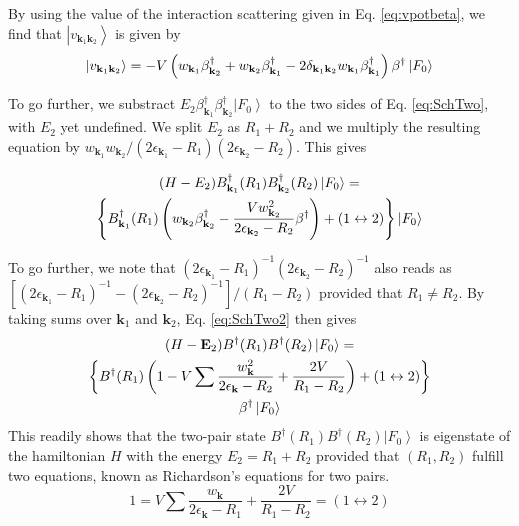 \documentclass[aps,prb,superscriptaddress,twocolumn]{revtex4}
\begin{document}
By using the value of the interaction scattering given in Eq.%
\eqref{eq:vpotbeta}, we find that $\left|v_{\mathbf{k} _1\mathbf{k}
_2}\right> $ is given by 
\begin{equation}
\left|v_{\mathbf{k} _1\mathbf{k} _2}\right> =-V\left(w_{\mathbf{k}
_1}\beta^{\dagger}_{\mathbf{k} _2}+w_{\mathbf{k} _2}\beta^{\dagger}_{\mathbf{%
k} _1}-2\delta_{\mathbf{k} _1\mathbf{k} _2}w_{\mathbf{k} _1}\beta^{\dagger}_{%
\mathbf{k} _1}\right) \beta^{\dagger}\left|F_0\right>  
\end{equation}

To go further, we substract $E _2\beta^{\dagger}_{\mathbf{k}
_1}\beta^{\dagger}_{\mathbf{k} _2}\left|F_0\right>  $ to the two sides of Eq.%
\eqref{eq:SchTwo}, with $E _2$ yet undefined. We split $E _2$ as $R_1+R_2$ and we multiply
the resulting equation by $w_{\mathbf{k} _1}w_{\mathbf{k} _2}/\left(2%
\epsilon_{\mathbf{k} _1}-R_1\right) \left(2\epsilon_{\mathbf{k}
_2}-R_2\right) $. This gives

\begin{multline}  \label{eq:SchTwo2}
(H-E _2)B^{\dagger}_{\mathbf{k} _1}(R_1)B^{\dagger}_{\mathbf{k}
_2}(R_2)\left|F_0\right>   = \\
\left\{B^{\dagger}_{\mathbf{k} _1}(R_1)\left(w_{\mathbf{k}
_2}\beta^{\dagger}_{\mathbf{k} _2}-\frac{Vw_{\mathbf{k} _2}^2}{2\epsilon_{%
\mathbf{k} _2}-R_2}\beta^{\dagger}\right)  +(1\leftrightarrow2)\right\}
\left|F_0\right>  
\end{multline}

To go further, we note that $\left(2\epsilon_{\mathbf{k} _1}-R_1\right)
^{-1}\left(2\epsilon_{\mathbf{k} _2}-R_2\right) ^{-1}$ also reads as $\left[%
\left(2\epsilon_{\mathbf{k} _1}-R_1\right) ^{-1}-\left(2\epsilon_{\mathbf{k}
_2}-R_2\right) ^{-1}\right] /\left(R_1-R_2\right) $ provided that $R_1\neq{}%
R_2$. By taking sums over $\mathbf{k} _1$ and $\mathbf{k} _2$, Eq. %
\eqref{eq:SchTwo2} then gives 
\begin{multline}  \label{eq:SchTwo3}
(H-\mathbf{E} _2)B^{\dagger}(R_1)B^{\dagger}(R_2)\left|F_0\right>   = \\
\left\{B^{\dagger}(R_1)\left(1-V\sum\frac{w_{\mathbf{k} }^2}{2\epsilon_{%
\mathbf{k} }-R_2}+\frac{2V}{R_1-R_2}\right) +(1\leftrightarrow2)\right\}  \\
\beta^{\dagger}\left|F_0\right>  
\end{multline}
This readily shows that the two-pair state $B^{\dagger}(R_1)B^{\dagger}(R_2)%
\left|F_0\right>  $ is eigenstate of the hamiltonian $H$ with the energy $%
E _2=R_1+R_2$ provided that $\left(R_1,R_2\right) $ fulfill two
equations, known as Richardson's equations for two pairs. 
\begin{equation}
1=V\sum\frac{w_{\mathbf{k} }}{2\epsilon_{\mathbf{k} }-R_1}+\frac{2V}{R_1-R_2}%
=(1\leftrightarrow2)
\end{equation}
\end{document}
